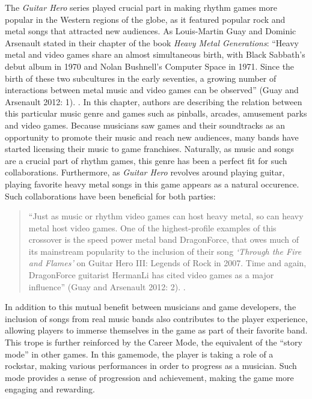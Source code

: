 The \textit{Guitar Hero} series played crucial part in making rhythm games more popular in the Western regions of the globe, as it featured popular rock and metal songs that attracted new audiences. As Louis-Martin Guay and Dominic Arsenault stated in their chapter of the book \textit{Heavy Metal Generations}: “Heavy metal and video games share an almost simultaneous birth, with Black Sabbath’s debut album in 1970 and Nolan Bushnell’s Computer Space in 1971. Since the birth of these two subcultures in the early seventies, a growing number of interactions between metal music and video games can be observed” (Guay and Arsenault 2012: 1). \cite{heavymetal}. In this chapter, authors are describing the relation between this particular music genre and games such as pinballs, arcades, amusement parks and video games. Because musicians saw games and their soundtracks as an opportunity to promote their music and reach new audiences, many bands have started licensing their music to game franchises. Naturally, as music and songs are a crucial part of rhythm games, this genre has been a perfect fit for such collaborations. Furthermore, as \textit{Guitar Hero} revolves around playing guitar, playing favorite heavy metal songs in this game appears as a natural occurence. Such collaborations have been beneficial for both parties:
\begin{quote}
    “Just as music or rhythm video games can host heavy metal, so can heavy metal host video games. One of the highest-profile examples of this crossover is the speed power metal band DragonForce, that owes much of its mainstream popularity to the inclusion of their song \textit{‘Through the Fire and Flames’} on Guitar Hero III: Legends of Rock in 2007. Time and again, DragonForce guitarist HermanLi has cited video games as a major influence” (Guay and Arsenault 2012: 2). \cite{heavymetal}.
\end{quote}
In addition to this mutual benefit between musicians and game developers, the inclusion of songs from real music bands also contributes to the player experience, allowing players to immerse themselves in the game as part of their favorite band. This trope is further reinforced by the Career Mode, the equivalent of the “story mode” in other games. In this gamemode, the player is taking a role of a rockstar, making various performances in order to progress as a musician. Such mode provides a sense of progression and achievement, making the game more engaging and rewarding.

